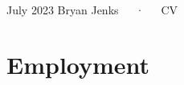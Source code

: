 \documentclass[11pt,a4paper,]{awesome-cv}
\begin{document}
\makecvheader

\makecvfooter
  {July 2023}
    {Bryan Jenks~~~·~~~CV}
  {\thepage}





\hypertarget{employment}{%
\section{Employment}\label{employment}}
\end{document}
